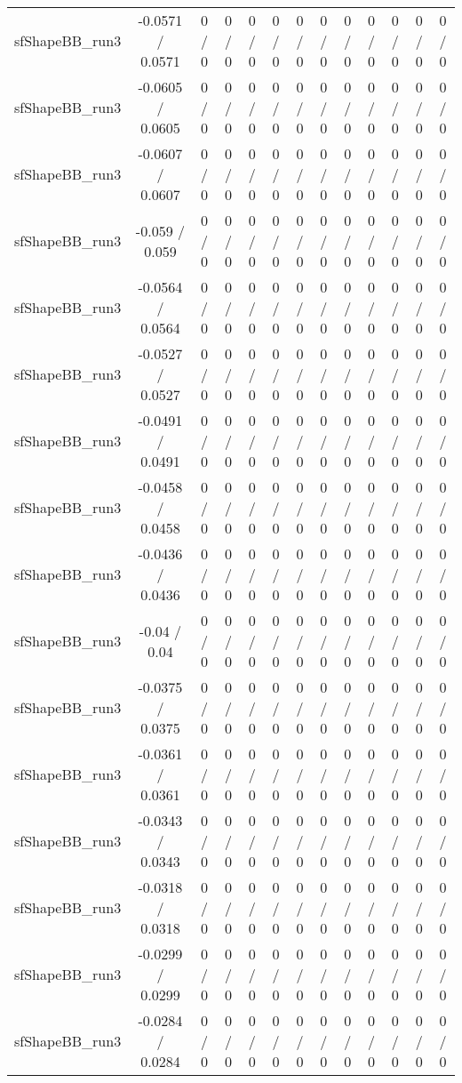 \documentclass[10pt]{article}
\begin{document}
\begin{table}[htbp]
\begin{center}
\begin{tabular}{|c|c|c|c|c|c|c|c|c|c|c|c|c|}
  sfShapeBB_run3 & -0.0571 / 0.0571 & 0 / 0 & 0 / 0 & 0 / 0 & 0 / 0 & 0 / 0 & 0 / 0 & 0 / 0 & 0 / 0 & 0 / 0 & 0 / 0 & 0 / 0 \\ 
  sfShapeBB_run3 & -0.0605 / 0.0605 & 0 / 0 & 0 / 0 & 0 / 0 & 0 / 0 & 0 / 0 & 0 / 0 & 0 / 0 & 0 / 0 & 0 / 0 & 0 / 0 & 0 / 0 \\ 
  sfShapeBB_run3 & -0.0607 / 0.0607 & 0 / 0 & 0 / 0 & 0 / 0 & 0 / 0 & 0 / 0 & 0 / 0 & 0 / 0 & 0 / 0 & 0 / 0 & 0 / 0 & 0 / 0 \\ 
  sfShapeBB_run3 & -0.059 / 0.059 & 0 / 0 & 0 / 0 & 0 / 0 & 0 / 0 & 0 / 0 & 0 / 0 & 0 / 0 & 0 / 0 & 0 / 0 & 0 / 0 & 0 / 0 \\ 
  sfShapeBB_run3 & -0.0564 / 0.0564 & 0 / 0 & 0 / 0 & 0 / 0 & 0 / 0 & 0 / 0 & 0 / 0 & 0 / 0 & 0 / 0 & 0 / 0 & 0 / 0 & 0 / 0 \\ 
  sfShapeBB_run3 & -0.0527 / 0.0527 & 0 / 0 & 0 / 0 & 0 / 0 & 0 / 0 & 0 / 0 & 0 / 0 & 0 / 0 & 0 / 0 & 0 / 0 & 0 / 0 & 0 / 0 \\ 
  sfShapeBB_run3 & -0.0491 / 0.0491 & 0 / 0 & 0 / 0 & 0 / 0 & 0 / 0 & 0 / 0 & 0 / 0 & 0 / 0 & 0 / 0 & 0 / 0 & 0 / 0 & 0 / 0 \\ 
  sfShapeBB_run3 & -0.0458 / 0.0458 & 0 / 0 & 0 / 0 & 0 / 0 & 0 / 0 & 0 / 0 & 0 / 0 & 0 / 0 & 0 / 0 & 0 / 0 & 0 / 0 & 0 / 0 \\ 
  sfShapeBB_run3 & -0.0436 / 0.0436 & 0 / 0 & 0 / 0 & 0 / 0 & 0 / 0 & 0 / 0 & 0 / 0 & 0 / 0 & 0 / 0 & 0 / 0 & 0 / 0 & 0 / 0 \\ 
  sfShapeBB_run3 & -0.04 / 0.04 & 0 / 0 & 0 / 0 & 0 / 0 & 0 / 0 & 0 / 0 & 0 / 0 & 0 / 0 & 0 / 0 & 0 / 0 & 0 / 0 & 0 / 0 \\ 
  sfShapeBB_run3 & -0.0375 / 0.0375 & 0 / 0 & 0 / 0 & 0 / 0 & 0 / 0 & 0 / 0 & 0 / 0 & 0 / 0 & 0 / 0 & 0 / 0 & 0 / 0 & 0 / 0 \\ 
  sfShapeBB_run3 & -0.0361 / 0.0361 & 0 / 0 & 0 / 0 & 0 / 0 & 0 / 0 & 0 / 0 & 0 / 0 & 0 / 0 & 0 / 0 & 0 / 0 & 0 / 0 & 0 / 0 \\ 
  sfShapeBB_run3 & -0.0343 / 0.0343 & 0 / 0 & 0 / 0 & 0 / 0 & 0 / 0 & 0 / 0 & 0 / 0 & 0 / 0 & 0 / 0 & 0 / 0 & 0 / 0 & 0 / 0 \\ 
  sfShapeBB_run3 & -0.0318 / 0.0318 & 0 / 0 & 0 / 0 & 0 / 0 & 0 / 0 & 0 / 0 & 0 / 0 & 0 / 0 & 0 / 0 & 0 / 0 & 0 / 0 & 0 / 0 \\ 
  sfShapeBB_run3 & -0.0299 / 0.0299 & 0 / 0 & 0 / 0 & 0 / 0 & 0 / 0 & 0 / 0 & 0 / 0 & 0 / 0 & 0 / 0 & 0 / 0 & 0 / 0 & 0 / 0 \\ 
  sfShapeBB_run3 & -0.0284 / 0.0284 & 0 / 0 & 0 / 0 & 0 / 0 & 0 / 0 & 0 / 0 & 0 / 0 & 0 / 0 & 0 / 0 & 0 / 0 & 0 / 0 & 0 / 0 \\ 

\end{tabular}
\end{center}
\end{table}
\end{document}
